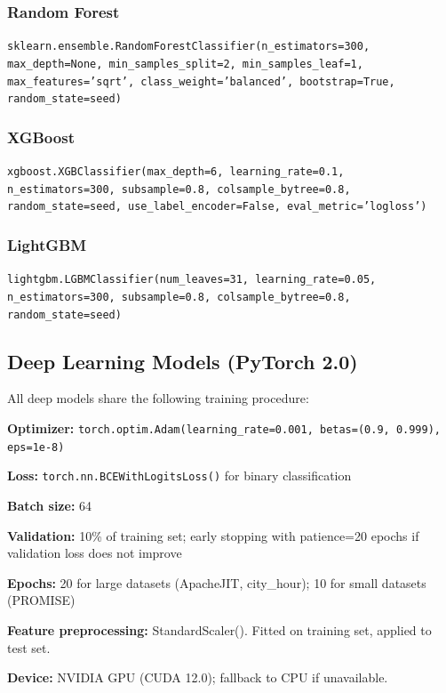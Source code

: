 \subsubsection{Random Forest}
\texttt{sklearn.ensemble.RandomForestClassifier(n\_estimators=300, max\_depth=None, min\_samples\_split=2, min\_samples\_leaf=1, max\_features='sqrt', class\_weight='balanced', bootstrap=True, random\_state=seed)}

\subsubsection{XGBoost}
\texttt{xgboost.XGBClassifier(max\_depth=6, learning\_rate=0.1, n\_estimators=300, subsample=0.8, colsample\_bytree=0.8, random\_state=seed, use\_label\_encoder=False, eval\_metric='logloss')}

\subsubsection{LightGBM}
\texttt{lightgbm.LGBMClassifier(num\_leaves=31, learning\_rate=0.05, n\_estimators=300, subsample=0.8, colsample\_bytree=0.8, random\_state=seed)}

\subsection{Deep Learning Models (PyTorch 2.0)}

All deep models share the following training procedure:

\textbf{Optimizer:} \texttt{torch.optim.Adam(learning\_rate=0.001, betas=(0.9, 0.999), eps=1e-8)}

\textbf{Loss:} \texttt{torch.nn.BCEWithLogitsLoss()} for binary classification

\textbf{Batch size:} 64

\textbf{Validation:} 10\% of training set; early stopping with patience=20 epochs if validation loss does not improve

\textbf{Epochs:} 20 for large datasets (ApacheJIT, city\_hour); 10 for small datasets (PROMISE)

\textbf{Feature preprocessing:} StandardScaler(). Fitted on training set, applied to test set.

\textbf{Device:} NVIDIA GPU (CUDA 12.0); fallback to CPU if unavailable.

